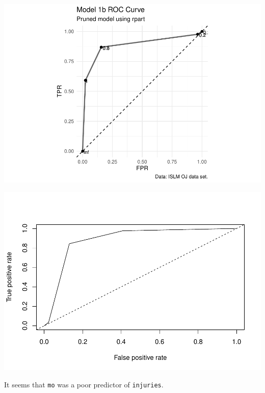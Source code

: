\documentclass[
]{book}
\newenvironment{Shaded}{\begin{snugshade}}{\end{snugshade}}
\newcommand{\DataTypeTok}[1]{\textcolor[rgb]{0.13,0.29,0.53}{#1}}
\newcommand{\KeywordTok}[1]{\textcolor[rgb]{0.13,0.29,0.53}{\textbf{#1}}}
\newcommand{\NormalTok}[1]{#1}
\newcommand{\OperatorTok}[1]{\textcolor[rgb]{0.81,0.36,0.00}{\textbf{#1}}}
\newcommand{\StringTok}[1]{\textcolor[rgb]{0.31,0.60,0.02}{#1}}
\begin{document}
\includegraphics{data-sci_files/figure-latex/unnamed-chunk-44-1.pdf}

\begin{Shaded}
\end{Shaded}

\includegraphics{data-sci_files/figure-latex/unnamed-chunk-45-1.pdf}

It seems that \texttt{mo} was a poor predictor of \texttt{injuries}.
\end{document}
